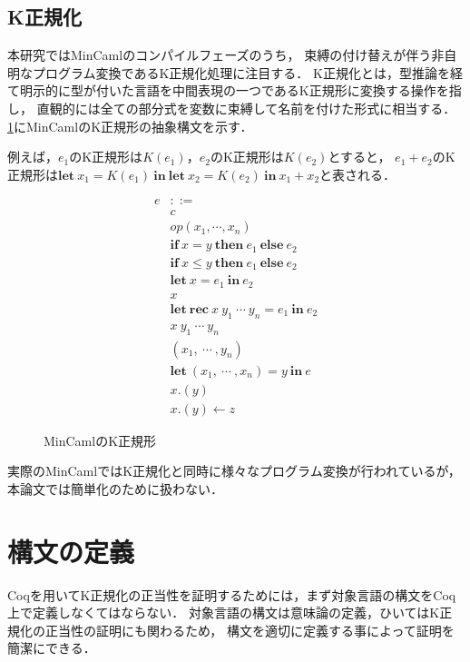 \documentclass{sumiilab-paper}
\newcommand{\keyword}[1]{\mathbf{#1}}
\newcommand{\IF}{\keyword{if}}
\newcommand{\THEN}{\keyword{then}}
\newcommand{\ELSE}{\keyword{else}}
\newcommand{\LET}{\keyword{let}}
\newcommand{\REC}{\keyword{rec}}
\newcommand{\IN}{\keyword{in}}
\begin{document}
\section{K正規化}
本研究ではMinCamlのコンパイルフェーズのうち，
束縛の付け替えが伴う非自明なプログラム変換であるK正規化処理に注目する．
K正規化とは，型推論を経て明示的に型が付いた言語を中間表現の一つであるK正規形\cite{Birkedal:1996:RIV:237721.237771}に変換する操作を指し，
直観的には全ての部分式を変数に束縛して名前を付けた形式に相当する．
\figurename\ref{eqn:mincaml-knormal}にMinCamlのK正規形の抽象構文を示す．

例えば，$e_1$のK正規形は$K(e_1)$，$e_2$のK正規形は$K(e_2)$とすると，
$e_1+e_2$のK正規形は$\LET~x_1=K(e_1)~\IN~\LET~x_2=K(e_2)~\IN~x_1+x_2$と表される．

\begin{figure}[htbp]
	\[ \begin{array}{ll}
			e & ::= \\
				& c \\
				& \textit{op}(x_1,\cdots,x_n) \\
				& \IF~x=y~\THEN~e_1~\ELSE~e_2 \\
				& \IF~x \leq y~\THEN~e_1~\ELSE~e_2 \\
			 	& \LET~x=e_1~\IN~e_2 \\
				& x \\
				& \LET~\REC~x~y_1~\cdots~y_n=e_1~\IN~e_2 \\
				& x~y_1~\cdots~y_n \\
				& (x_1,~\cdots~,y_n) \\
				& \LET~(x_1,~\cdots~,x_n)=y~\IN~e \\
				& x.(y) \\
				& x.(y)\leftarrow z
	\end{array} \]
	\caption{MinCamlのK正規形}
	\label{eqn:mincaml-knormal}
\end{figure}

実際のMinCamlではK正規化と同時に様々なプログラム変換が行われているが，
本論文では簡単化のために扱わない．

\chapter{構文の定義}
Coqを用いてK正規化の正当性を証明するためには，まず対象言語の構文をCoq上で定義しなくてはならない．
対象言語の構文は意味論の定義，ひいてはK正規化の正当性の証明にも関わるため，
構文を適切に定義する事によって証明を簡潔にできる．
\end{document}
